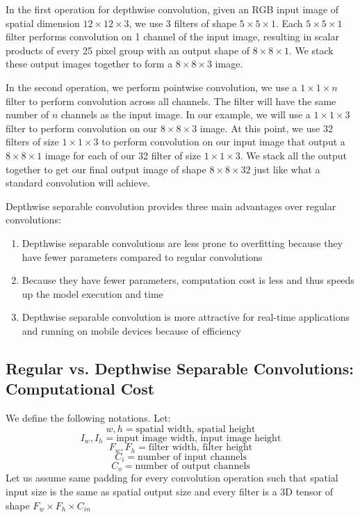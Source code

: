 \documentclass[master]{thesis-uestc}
\begin{document}
In the first operation for depthwise convolution, given an RGB input image of spatial dimension $12 \times 12 \times 3$, we use 3 filters of shape $5 \times 5\times 1$. Each $5 \times 5\times 1$ filter performs convolution on 1 channel of the input image, resulting in scalar products of every 25 pixel group with an output shape of $8\times8\times1$. We stack these output images together to form a $8\times8\times3$ image.

In the second operation, we perform pointwise convolution, we use a $1\times1\times n$ filter to perform convolution across all channels. The filter will have the same number of $n$ channels as the input image. In our example, we will use a $1\times1\times3$ filter to perform convolution on our $8\times8\times3$ image. At this point, we use 32 filters of size $1\times1\times3$ to perform convolution on our input image that output a $8\times8\times1$ image for each of our 32 filter of size $1\times1\times3$. We stack all the output together to get our final output image of shape $8\times8\times32$ just like what a standard convolution will achieve.

Depthwise separable convolution provides three main advantages over regular convolutions:
\begin{enumerate}
    \item Depthwise separable convolutions are less prone to overfitting because they have fewer parameters compared to regular convolutions
    \item Because they have fewer parameters, computation cost is less and thus speeds up the model execution and time
    \item Depthwise separable convolution is more attractive for real-time applications and running on mobile devices because of efficiency
\end{enumerate}

\subsection{Regular vs. Depthwise Separable Convolutions: Computational Cost}
We define the following notations. Let:
    \[w, h = \text{spatial width, spatial height}\]
    \[I_w, I_h = \text{input image width, input image height} \]
    \[F_w, F_h = \text{filter width, filter height}\]
    \[C_i = \text{number of input channels}\]
    \[C_o = \text{number of output channels}\]
Let us assume same padding for every convolution operation such that spatial input size is the same as spatial output size and every filter is a 3D tensor of shape $F_w \times F_h \times C_{in}$
\end{document}

